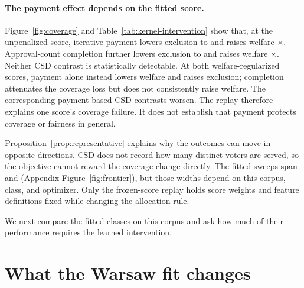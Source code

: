 \documentclass{article}
\begin{document}
\paragraph{The payment effect depends on the fitted score.}
Figure~\ref{fig:coverage} and Table~\ref{tab:kernel-intervention} show that, at
the unpenalized score, iterative payment lowers exclusion to
\KernelPaymentOnlyExcl{} and raises welfare
\KernelPaymentOnlyWelfareFactor$\times$. Approval-count completion further
lowers exclusion to \KernelPaymentCompleteExcl{} and raises welfare
\KernelPaymentCompleteWelfareFactor$\times$. Neither CSD contrast is
statistically detectable. At both welfare-regularized scores, payment alone
instead lowers welfare and raises exclusion; completion attenuates the coverage
loss but does not consistently raise welfare. The corresponding payment-based
CSD contrasts worsen. The replay therefore explains one score's coverage
failure. It does not establish that payment protects coverage or fairness in general.

Proposition~\ref{prop:representative} explains why the outcomes can move in
opposite directions. CSD does not record how many distinct voters are served,
so the objective cannot reward the coverage change directly. The fitted sweeps
span \RangeEndowWidth{} and \RangeOutcomeWidth{}
(Appendix Figure~\ref{fig:frontier}), but those widths depend on this corpus, class, and
optimizer. Only the frozen-score replay holds score weights and feature
definitions fixed while changing the allocation rule.

We next compare the fitted classes on this corpus and ask how much of their
performance requires the learned intervention.

\section{What the Warsaw fit changes}
\label{sec:frontier}
\end{document}
